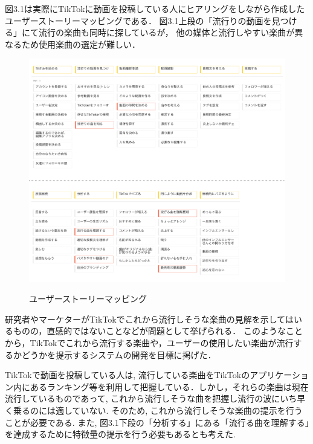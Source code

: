 \documentclass[titlepage]{jsreport}
\begin{document}
図3.1は実際にTikTokに動画を投稿している人にヒアリングをしながら作成したユーザーストーリーマッピングである．
図3.1上段の「流行りの動画を見つける」にて流行の楽曲も同時に探しているが， 他の媒体と流行しやすい楽曲が異なるため使用楽曲の選定が難しい．

\begin{figure}[htb]
\begin{center}
\includegraphics[width=120mm]{images/USM.png}
\label{fig:makemovie}
\caption{ユーザーストーリーマッピング}
\end{center}
\end{figure}

研究者やマーケターがTikTokでこれから流行しそうな楽曲の見解を示してはいるものの，直感的ではないことなどが問題として挙げられる．
このようなことから，TikTokでこれから流行する楽曲や，ユーザーの使用したい楽曲が流行するかどうかを提示するシステムの開発を目標に掲げた．

TikTokで動画を投稿している人は, 流行している楽曲をTikTokのアプリケーション内にあるランキング等を利用して把握している．しかし，それらの楽曲は現在流行しているものであって, これから流行しそうな曲を把握し流行の波にいち早く乗るのには適していない.
そのため, これから流行しそうな楽曲の提示を行うことが必要である.
また, 図3.1下段の「分析する」にある「流行る曲を理解する」を達成するために特徴量の提示を行う必要もあるとも考えた.
\end{document}
